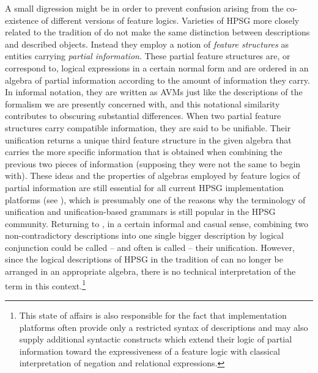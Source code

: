 \documentclass[output=paper,biblatex,babelshorthands,newtxmath,draftmode,colorlinks,citecolor=brown]{langscibook}
\begin{document}
A small digression might be in order to prevent confusion arising from
the co-existence of different versions of feature logics.  Varieties
of HPSG more closely related to the tradition of 
do not make the same distinction between descriptions and described
objects. Instead they employ a notion of \emph{feature structures} as
entities carrying \emph{partial information}. These partial feature
structures are, or correspond to, logical expressions in a certain
normal form and are ordered in an algebra of partial information
according to the amount of information they carry. In informal
notation, they are written as AVMs just like the descriptions of the
formalism we are presently concerned with, and this notational
similarity contributes to obscuring substantial differences.  When two
partial feature structures carry compatible information, they are said
to be unifiable. Their unification returns a unique third feature
structure in the given algebra that carries the more specific
information that is obtained when combining the previous two pieces of
information (supposing they were not the same to begin with). These ideas and the
properties of algebras employed by feature logics of partial information are
still essential for all current HPSG implementation platforms (see ), which
is presumably one of the reasons why the terminology of unification
and unification-based grammars is still popular in the HPSG
community. Returning to , in a certain
informal and casual sense, combining two non-contradictory descriptions
into one single bigger description by logical conjunction could be
called -- and often is called -- their unification. However, since the
logical descriptions of HPSG in the tradition of 
can no longer be arranged in an appropriate algebra, there is no
technical interpretation of the term in this context.\footnote{This
  state of affairs is also responsible for the fact that
  implementation platforms often provide only a restricted syntax of
  descriptions and may also supply additional syntactic constructs which
  extend their logic of partial information toward the expressiveness of
  a feature logic with classical interpretation of negation and
  relational expressions.}
\end{document}
